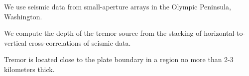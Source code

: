 \documentclass[draft]{agujournal2019}
\begin{document}



\begin{keypoints}
\item We use seismic data from small-aperture arrays in the Olympic Peninsula, Washington.
\item We compute the depth of the tremor source from the stacking of horizontal-to-vertical cross-correlations of seismic data.
\item Tremor is located close to the plate boundary in a region no more than 2-3 kilometers thick.
\end{keypoints}

%
%

%
%

\end{document}
